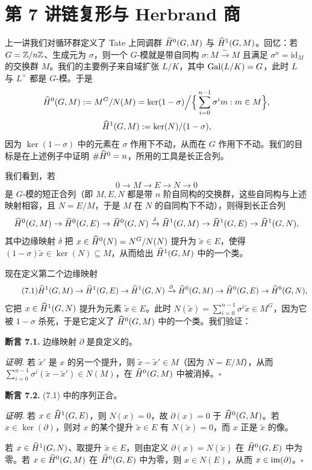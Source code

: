 \section*{第 7 讲\quad 链复形与 Herbrand 商}

上一讲我们对循环群定义了 Tate 上同调群 $\widehat{H}^0(G,M)$ 与 $\widehat{H}^1(G,M)$。回忆：若 $G=\mathbb{Z}/n\mathbb{Z}$、生成元为 $\sigma$，则一个 $G$-模就是带自同构 $\sigma:M\xrightarrow{\sim}M$ 且满足 $\sigma^n=\mathrm{id}_M$ 的交换群 $M$。我们的主要例子来自域扩张 $L/K$，其中 $\operatorname{Gal}(L/K)=G$，此时 $L$ 与 $L^\times$ 都是 $G$-模。于是
\[
\widehat{H}^0(G,M):=M^G/N(M)=\ker(1-\sigma)\Big/\Big\{\sum_{i=0}^{n-1}\sigma^i m:m\in M\Big\},
\]
\[
\widehat{H}^1(G,M):=\ker(N)/(1-\sigma),
\]
因为 $\ker(1-\sigma)$ 中的元素在 $\sigma$ 作用下不动，从而在 $G$ 作用下不动。我们的目标是在上述例子中证明 $\#\widehat{H}^0=n$，所用的工具是长正合列。

我们看到，若
\[
0\to M\to E\to N\to 0
\]
是 $G$-模的短正合列（即 $M,E,N$ 都是带 $n$ 阶自同构的交换群，这些自同构与上述映射相容，且 $N=E/M$，于是 $M$ 在 $N$ 的自同构下不动），则得到长正合列
\[
\widehat{H}^0(G,M)\to\widehat{H}^0(G,E)\to\widehat{H}^0(G,N)\xrightarrow{\delta}\widehat{H}^1(G,M)\to\widehat{H}^1(G,E)\to\widehat{H}^1(G,N),
\]
其中边缘映射 $\delta$ 把 $x\in\widehat{H}^0(N)=N^G/N(N)$ 提升为 $\tilde x\in E$，使得 $(1-\sigma)\tilde x\in\ker(N)\subseteq M$，从而给出 $\widehat{H}^1(G,M)$ 中的一个类。

现在定义第二个边缘映射
\begin{equation}\tag{7.1}
\widehat{H}^1(G,M)\to\widehat{H}^1(G,E)\to\widehat{H}^1(G,N)\xrightarrow{\partial}\widehat{H}^0(G,M)\to\widehat{H}^0(G,E)\to\widehat{H}^0(G,N),
\end{equation}
它把 $x\in\widehat{H}^1(G,N)$ 提升为元素 $\tilde x\in E$。此时 $N(\tilde x)=\sum_{i=0}^{n-1}\sigma^i\tilde x\in M^G$，因为它被 $1-\sigma$ 杀死，于是它定义了 $\widehat{H}^0(G,M)$ 中的一个类。我们验证：

\textbf{断言 7.1.} 边缘映射 $\partial$ 是良定义的。

\textit{证明.} 若 $\tilde x'$ 是 $x$ 的另一个提升，则 $\tilde x-\tilde x'\in M$（因为 $N=E/M$），从而 $\sum_{i=0}^{n-1}\sigma^i(\tilde x-\tilde x')\in N(M)$，在 $\widehat{H}^0(G,M)$ 中被消掉。\hfill$\square$

\textbf{断言 7.2.} (7.1) 中的序列正合。

\textit{证明.} 若 $x\in\widehat{H}^1(G,E)$，则 $N(x)=0$，故 $\partial(x)=0$ 于 $\widehat{H}^0(G,M)$。若 $x\in\ker(\partial)$，则对 $x$ 的某个提升 $\tilde x\in E$ 有 $N(\tilde x)=0$，而 $x$ 正是 $\tilde x$ 的像。

若 $x\in\widehat{H}^1(G,N)$、取提升 $\tilde x\in E$，则由定义 $\partial(x)=N(\tilde x)$ 在 $\widehat{H}^0(G,E)$ 中为零。若 $x\in\widehat{H}^0(G,M)$ 在 $\widehat{H}^0(G,E)$ 中为零，则 $x\in N(E)$，从而 $x\in\operatorname{im}(\partial)$。\hfill$\square$

